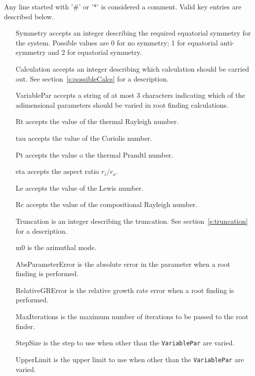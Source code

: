 \documentclass[a4paper,10pt]{book}
\begin{document}
Any line started with '\#' or '*' is considered a comment.
Valid key entries are described below.
\begin{itemize}
\item[Symmetry] accepts an integer describing the required equatorial symmetry for the system. Possible values are 0 for no symmetry; 1 for equatorial anti-symmetry and 2 for equatorial symmetry.
\item[Calculation] accepts an integer describing which calculation should be carried out. See section~\ref{s:possibleCalcs} for a description.
\item[VariablePar] accepts a string of at most 3 characters indicating which of the adimensional parameters should be varied in root finding calculations.
\item[Rt] accepts the value of the thermal Rayleigh number.
\item[tau] accepts the value of the Coriolis number.
\item[Pt] accepts the value o the thermal Prandtl number.
\item[eta] accepts the aspect ratio $r_i/r_o$. 
\item[Le] accepts the value of the Lewis number.
\item[Rc] accepts the value of the compositional Rayleigh number.
\item[Truncation] is an integer describing the truncation. See section~\ref{s:truncation} for a description.
\item[m0] is the azimuthal mode.
\item[AbsParameterError] is the absolute error in the parameter when a root finding is performed.
\item[RelativeGRError] is the relative growth rate error when a root finding is performed.
\item[MaxIterations] is the maximum number of iterations to be passed to the root finder.
\item[StepSize] is the step to use when other than the \verb|VariablePar| are varied.
\item[UpperLimit] is the upper limit to use when other than the \verb|VariablePar| are varied.
\end{itemize}
\end{document}
